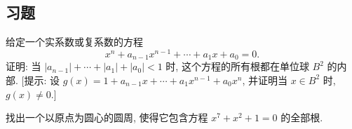 \subsection*{习题}

\begin{exercise}
给定一个实系数或复系数的方程
\[
x^{n}+a_{n-1}x^{n-1}+\cdots+a_{1}x+a_{0}=0.
\]
证明: 当 $|a_{n-1}|+\cdots+|a_{1}|+|a_{0}|<1$ 时, 这个方程的所有根都在单位球 $B^{2}$ 的内部. [提示: 设 $g(x)=1+a_{n-1}x+\cdots+a_{1}x^{n-1}+a_{0}x^n$, 并证明当 $x\in B^{2}$ 时, $g(x)\neq 0$.]
\end{exercise}

\begin{exercise}
找出一个以原点为圆心的圆周, 使得它包含方程 $x^7+x^2+1=0$ 的全部根.
\end{exercise}